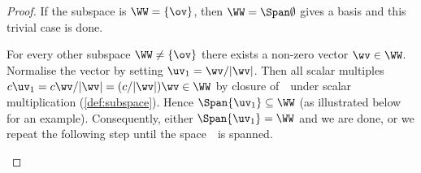 \begin{proof} 
If the subspace is \(\WW=\{\ov\}\), then \(\WW=\Span\emptyset\) gives a basis and this trivial case is done.

For every other subspace \(\WW\neq\{\ov\}\) there exists a non-zero vector \(\wv\in\WW\).
Normalise the vector by setting \(\uv_1=\wv/|\wv|\).
Then all scalar multiples \(c\uv_1=c\wv/|\wv|=(c/|\wv|)\wv\in\WW\) by closure of~\WW\ under scalar multiplication (\autoref{def:subspace}). 
Hence \(\Span\{\uv_1\}\subseteq\WW\) (as illustrated below for an example).
Consequently, either  \(\Span\{\uv_1\}=\WW\) and we are done, or we repeat the following step until the space~\WW\ is spanned.
\begin{center}
\end{center}


\end{proof}
